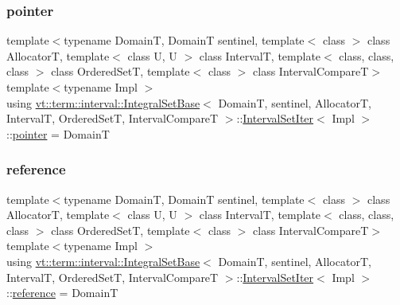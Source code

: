\mbox{\label{structvt_1_1term_1_1interval_1_1_integral_set_base_1_1_interval_set_iter_a9da8b4820369a4e830f6ca596e08270c}} 
\subsubsection{\texorpdfstring{pointer}{pointer}}
{\footnotesize\ttfamily template$<$typename DomainT, DomainT sentinel, template$<$ class $>$ class AllocatorT, template$<$ class U, U $>$ class IntervalT, template$<$ class, class, class $>$ class Ordered\+SetT, template$<$ class $>$ class Interval\+CompareT$>$ \\
template$<$typename Impl $>$ \\
using \hyperlink{structvt_1_1term_1_1interval_1_1_integral_set_base}{vt\+::term\+::interval\+::\+Integral\+Set\+Base}$<$ DomainT, sentinel, AllocatorT, IntervalT, Ordered\+SetT, Interval\+CompareT $>$\+::\hyperlink{structvt_1_1term_1_1interval_1_1_integral_set_base_1_1_interval_set_iter}{Interval\+Set\+Iter}$<$ Impl $>$\+::\hyperlink{structvt_1_1term_1_1interval_1_1_integral_set_base_1_1_interval_set_iter_a9da8b4820369a4e830f6ca596e08270c}{pointer} =  DomainT}

\mbox{\label{structvt_1_1term_1_1interval_1_1_integral_set_base_1_1_interval_set_iter_a59b5e1223198deaeacb85051517dd80a}} 
\subsubsection{\texorpdfstring{reference}{reference}}
{\footnotesize\ttfamily template$<$typename DomainT, DomainT sentinel, template$<$ class $>$ class AllocatorT, template$<$ class U, U $>$ class IntervalT, template$<$ class, class, class $>$ class Ordered\+SetT, template$<$ class $>$ class Interval\+CompareT$>$ \\
template$<$typename Impl $>$ \\
using \hyperlink{structvt_1_1term_1_1interval_1_1_integral_set_base}{vt\+::term\+::interval\+::\+Integral\+Set\+Base}$<$ DomainT, sentinel, AllocatorT, IntervalT, Ordered\+SetT, Interval\+CompareT $>$\+::\hyperlink{structvt_1_1term_1_1interval_1_1_integral_set_base_1_1_interval_set_iter}{Interval\+Set\+Iter}$<$ Impl $>$\+::\hyperlink{structvt_1_1term_1_1interval_1_1_integral_set_base_1_1_interval_set_iter_a59b5e1223198deaeacb85051517dd80a}{reference} =  DomainT}

